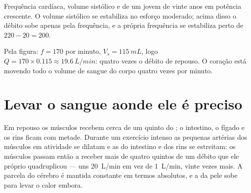 \begin{omfigure}

{\small Frequência cardíaca, volume sistólico e  de um
jovem de vinte anos em potência crescente. O volume sistólico se
estabiliza no esforço moderado; acima disso o débito sobe apenas pela
frequência, e a própria frequência se estabiliza perto de
$220 - 20 = 200$.}
\end{omfigure}

\begin{example}\label{ex:g10:heart-lungs-effort:output200}
Pela figura: $f = 170$ por minuto, $V_s = \qty{115}{mL}$, logo
$Q = 170 \times 0.115 \approx \qty{19.6}{L/min}$: quatro vezes o débito
de repouso. O coração está movendo todo o volume de sangue do corpo
quatro vezes por minuto.
\end{example}

\section{Levar o sangue aonde ele é preciso}

\begin{proposition}\label{prop:g10:heart-lungs-effort:redistribution}
Em repouso os músculos recebem cerca de um quinto do ; o
intestino, o fígado e os rins ficam com metade. Durante um exercício
intenso as pequenas artérias dos músculos em atividade se dilatam e as
do intestino e dos rins se estreitam: os músculos passam então a
receber mais de quatro quintos de um débito que ele próprio
quadruplicou --- uns \qty{20}{L/min} em vez de \qty{1}{L/min}, vinte
vezes mais. A parcela do cérebro é mantida constante em termos
absolutos, e a da pele sobe para levar o calor embora.
\end{proposition}
\admitted

